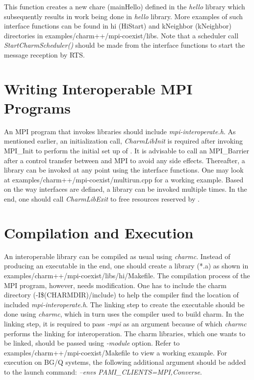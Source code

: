 \begin{itemize}
This function creates a new chare (mainHello) defined in the {\em hello} library which
subsequently results in work being done in {\em hello} library.
More examples of such interface functions can
be found in hi (HiStart) and kNeighbor (kNeighbor) directories in
examples/charm++/mpi-coexist/libs. Note that a scheduler call {\em
StartCharmScheduler()} should be made from the interface functions to start the
message reception by \charmpp{} RTS.
\end{itemize}

\section{Writing Interoperable MPI Programs}
An MPI program that invokes \charmpp{} libraries should include {\em mpi-interoperate.h}.
As mentioned earlier, an initialization call, {\em CharmLibInit} is
required after invoking MPI\_Init to perform the initial set up of \charmpp{}.
It is advisable to call an MPI\_Barrier after a control transfer between \charmpp{}
and MPI to avoid any side effects. Thereafter, a \charmpp{} library can be invoked at
any point using the interface functions. One may look at
examples/charm++/mpi-coexist/multirun.cpp for a working example. Based on the
way interfaces are defined, a library can be invoked multiple times. In the end,
one should call {\em CharmLibExit} to free resources reserved by \charmpp{}.

\section{Compilation and Execution}
An interoperable \charmpp{} library can be compiled as usual using {\em charmc}.
Instead of producing an executable in the end, one should create a library (*.a)
as shown in examples/charm++/mpi-coexist/libs/hi/Makefile. The compilation
process of the MPI program, however, needs modification. One has to include the
charm directory (-I\$(CHARMDIR)/include) to help the compiler find the location of
included {\em mpi-interoperate.h}. The linking step to create the executable
should be done using {\em charmc}, which in turn uses the compiler used to build
charm. In the linking step, it is required to pass {\em -mpi} as an argument
because of which {\em charmc} performs the linking for interoperation. The charm
libraries, which one wants to be linked, should be passed using {\em -module}
option. Refer to examples/charm++/mpi-coexist/Makefile to view a working
example. For execution on BG/Q systems, the following additional argument should be
added to the launch command: {\em --envs PAMI\_CLIENTS=MPI,Converse}.


